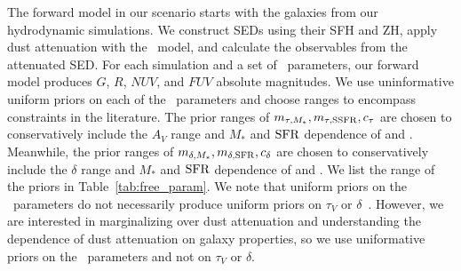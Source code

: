 The forward model in our scenario starts with the galaxies from our
hydrodynamic simulations. We construct SEDs using their SFH and ZH,
apply dust attenuation with the \eda~model, and calculate the observables from
the attenuated SED. For each simulation and a set of \eda~parameters, our forward model
produces $G$, $R$, $NUV$, and $FUV$ absolute magnitudes. We use uninformative uniform priors on each of
the \eda~parameters and choose ranges to encompass constraints in the
literature. The prior ranges of $m_{\tau,M_*}, m_{\tau,{\rm SSFR}}, c_\tau$ are chosen to
conservatively include the $A_V$ range and $M_*$ and ${\rm SFR}$ dependence of
\cite{narayanan2018} and \cite{salim2020}. Meanwhile, the prior ranges of 
$m_{\delta,M_*}, m_{\delta,{\rm SFR}}, c_\delta$ are chosen to conservatively include the $\delta$
range and $M_*$ and ${\rm SFR}$ dependence of \cite{leja2017} and \cite{salim2018}. 
We list the range of the priors in Table~\ref{tab:free_param}. We note that
uniform priors on the \eda~parameters do not necessarily produce uniform priors 
on $\tau_V$ or $\delta$~\citep[\eg][]{handley2019}. However, we are interested in
marginalizing over dust attenuation and understanding the dependence of dust
attenuation on galaxy properties, so we use uniformative priors on the
\eda~parameters and not on $\tau_V$ or $\delta$. 

